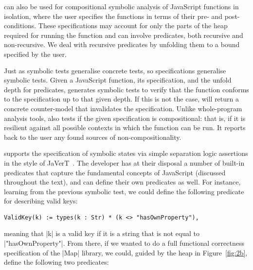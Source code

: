 
\cosette can also be used for compositional symbolic analysis of JavaScript functions in isolation, where the user specifies the functions in terms of their pre- and post-conditions. These specifications may account for only the parts of the heap required for running the function and can involve predicates, both recursive and non-recursive. We deal with recursive predicates by unfolding them to a  bound specified by the user.

Just as symbolic tests generalise concrete tests, so specifications
generalise symbolic tests. Given a JavaScript function, its
specification, and the unfold depth for predicates, \cosette generates
symbolic tests to verify that the function conforms to the
specification up to that given depth. If this is not the case,
\cosette will return a concrete counter-model that invalidates the
specification. Unlike whole-program analysis tools, \cosette also
tests if the given specification is compositional: that is, if it is
resilient against all possible contexts in which the function can be
run.
It  reports back to the user any found sources of non-compositionality.

\cosette supports the specification of symbolic states via simple separation logic assertions in the style of JaVerT~\cite{javert}. The developer has at their disposal a number of built-in predicates that capture the fundamental concepts of JavaScript (discussed throughout the text), and can define their own predicates as well. For instance, learning from the previous symbolic test, we could define the following predicate for describing valid keys:
\begin{Verbatim}[fontsize=\footnotesize,commandchars=\\\{\}]
    ValidKey(k) := types(k : Str) * (k <> "hasOwnProperty"),
\end{Verbatim}
\noindent meaning that \jsinline|k| is a valid key if it is a string that is not equal to \jsinline|"hasOwnProperty"|. From there, if we wanted to do a full functional correctness specification of the \jsinline|Map| library, we could, guided by the heap in Figure~\ref{fig:2b}, define the following two predicates:

